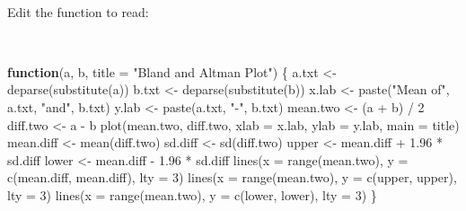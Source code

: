 \documentclass[
  12pt,
  a4paper]{book}
\newenvironment{Shaded}{\begin{snugshade}}{\end{snugshade}}
\newcommand{\AttributeTok}[1]{\textcolor[rgb]{0.77,0.63,0.00}{#1}}
\newcommand{\ControlFlowTok}[1]{\textcolor[rgb]{0.13,0.29,0.53}{\textbf{#1}}}
\newcommand{\DecValTok}[1]{\textcolor[rgb]{0.00,0.00,0.81}{#1}}
\newcommand{\FloatTok}[1]{\textcolor[rgb]{0.00,0.00,0.81}{#1}}
\newcommand{\FunctionTok}[1]{\textcolor[rgb]{0.00,0.00,0.00}{#1}}
\newcommand{\NormalTok}[1]{#1}
\newcommand{\OtherTok}[1]{\textcolor[rgb]{0.56,0.35,0.01}{#1}}
\newcommand{\SpecialCharTok}[1]{\textcolor[rgb]{0.00,0.00,0.00}{#1}}
\newcommand{\StringTok}[1]{\textcolor[rgb]{0.31,0.60,0.02}{#1}}
\begin{document}
~

Edit the function to read:

~

\begin{Shaded}
\begin{Highlighting}[]
\ControlFlowTok{function}\NormalTok{(a, b, }\AttributeTok{title =} \StringTok{"Bland and Altman Plot"}\NormalTok{) \{}
\NormalTok{  a.txt }\OtherTok{\textless{}{-}} \FunctionTok{deparse}\NormalTok{(}\FunctionTok{substitute}\NormalTok{(a))}
\NormalTok{  b.txt }\OtherTok{\textless{}{-}} \FunctionTok{deparse}\NormalTok{(}\FunctionTok{substitute}\NormalTok{(b))}
\NormalTok{  x.lab }\OtherTok{\textless{}{-}} \FunctionTok{paste}\NormalTok{(}\StringTok{"Mean of"}\NormalTok{, a.txt, }\StringTok{"and"}\NormalTok{, b.txt)}
\NormalTok{  y.lab }\OtherTok{\textless{}{-}} \FunctionTok{paste}\NormalTok{(a.txt, }\StringTok{"{-}"}\NormalTok{, b.txt)}
\NormalTok{  mean.two }\OtherTok{\textless{}{-}}\NormalTok{ (a }\SpecialCharTok{+}\NormalTok{ b) }\SpecialCharTok{/} \DecValTok{2}
\NormalTok{  diff.two }\OtherTok{\textless{}{-}}\NormalTok{ a }\SpecialCharTok{{-}}\NormalTok{ b}
  \FunctionTok{plot}\NormalTok{(mean.two, diff.two, }\AttributeTok{xlab =}\NormalTok{ x.lab, }\AttributeTok{ylab =}\NormalTok{ y.lab, }\AttributeTok{main =}\NormalTok{ title) }
\NormalTok{  mean.diff }\OtherTok{\textless{}{-}} \FunctionTok{mean}\NormalTok{(diff.two)}
\NormalTok{  sd.diff }\OtherTok{\textless{}{-}} \FunctionTok{sd}\NormalTok{(diff.two)}
\NormalTok{  upper }\OtherTok{\textless{}{-}}\NormalTok{ mean.diff }\SpecialCharTok{+} \FloatTok{1.96} \SpecialCharTok{*}\NormalTok{ sd.diff}
\NormalTok{  lower }\OtherTok{\textless{}{-}}\NormalTok{ mean.diff }\SpecialCharTok{{-}} \FloatTok{1.96} \SpecialCharTok{*}\NormalTok{ sd.diff}
  \FunctionTok{lines}\NormalTok{(}\AttributeTok{x =} \FunctionTok{range}\NormalTok{(mean.two), }\AttributeTok{y =} \FunctionTok{c}\NormalTok{(mean.diff, mean.diff), }\AttributeTok{lty =} \DecValTok{3}\NormalTok{) }
  \FunctionTok{lines}\NormalTok{(}\AttributeTok{x =} \FunctionTok{range}\NormalTok{(mean.two), }\AttributeTok{y =} \FunctionTok{c}\NormalTok{(upper, upper), }\AttributeTok{lty =} \DecValTok{3}\NormalTok{)}
  \FunctionTok{lines}\NormalTok{(}\AttributeTok{x =} \FunctionTok{range}\NormalTok{(mean.two), }\AttributeTok{y =} \FunctionTok{c}\NormalTok{(lower, lower), }\AttributeTok{lty =} \DecValTok{3}\NormalTok{)}
\NormalTok{\}}
\end{Highlighting}
\end{Shaded}

~
\end{document}
